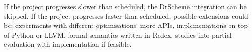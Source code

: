 \documentclass[12pt]{article}
\begin{document}
\noindent
If the project progresses slower than scheduled, the DrScheme integration can be skipped. If the project progresses faster than scheduled, possible extensions could be: experiments with different optimisations, more APIs, implementations on top of Python or LLVM, formal semantics written in Redex, studies into partial evaluation with implementation if feasible.





%







\end{document}
